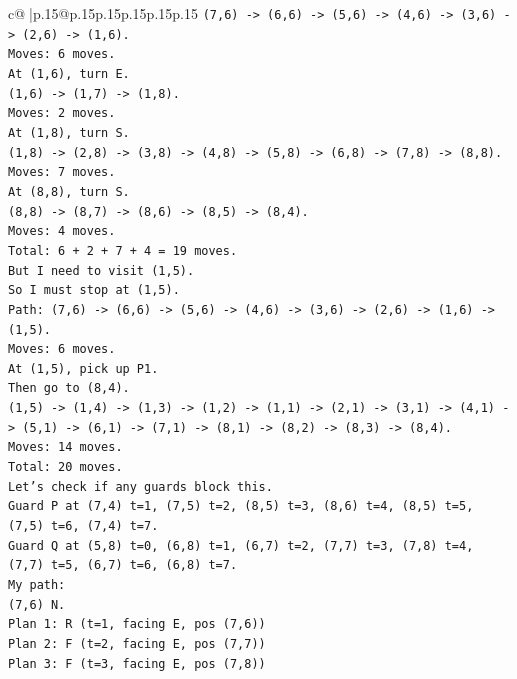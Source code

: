 \documentclass{article}
\begin{document}
{\begin{supertabular}{c@{$\;$}|p{.15\linewidth}@{}p{.15\linewidth}p{.15\linewidth}p{.15\linewidth}p{.15\linewidth}p{.15\linewidth}}
{{{\texttt{(7,6) {-}> (6,6) {-}> (5,6) {-}> (4,6) {-}> (3,6) {-}> (2,6) {-}> (1,6).} \\
\texttt{Moves: 6 moves.} \\
\texttt{At (1,6), turn E.} \\
\texttt{(1,6) {-}> (1,7) {-}> (1,8).} \\
\texttt{Moves: 2 moves.} \\
\texttt{At (1,8), turn S.} \\
\texttt{(1,8) {-}> (2,8) {-}> (3,8) {-}> (4,8) {-}> (5,8) {-}> (6,8) {-}> (7,8) {-}> (8,8).} \\
\texttt{Moves: 7 moves.} \\
\texttt{At (8,8), turn S.} \\
\texttt{(8,8) {-}> (8,7) {-}> (8,6) {-}> (8,5) {-}> (8,4).} \\
\texttt{Moves: 4 moves.} \\
\texttt{Total: 6 + 2 + 7 + 4 = 19 moves.} \\
\texttt{But I need to visit (1,5).} \\
\texttt{So I must stop at (1,5).} \\
\texttt{Path: (7,6) {-}> (6,6) {-}> (5,6) {-}> (4,6) {-}> (3,6) {-}> (2,6) {-}> (1,6) {-}> (1,5).} \\
\texttt{Moves: 6 moves.} \\
\texttt{At (1,5), pick up P1.} \\
\texttt{Then go to (8,4).} \\
\texttt{(1,5) {-}> (1,4) {-}> (1,3) {-}> (1,2) {-}> (1,1) {-}> (2,1) {-}> (3,1) {-}> (4,1) {-}> (5,1) {-}> (6,1) {-}> (7,1) {-}> (8,1) {-}> (8,2) {-}> (8,3) {-}> (8,4).} \\
\texttt{Moves: 14 moves.} \\
\texttt{Total: 20 moves.} \\
\texttt{Let's check if any guards block this.} \\
\texttt{Guard P at (7,4) t=1, (7,5) t=2, (8,5) t=3, (8,6) t=4, (8,5) t=5, (7,5) t=6, (7,4) t=7.} \\
\texttt{Guard Q at (5,8) t=0, (6,8) t=1, (6,7) t=2, (7,7) t=3, (7,8) t=4, (7,7) t=5, (6,7) t=6, (6,8) t=7.} \\
\texttt{My path:} \\
\texttt{(7,6) N.} \\
\texttt{Plan 1: R (t=1, facing E, pos (7,6))} \\
\texttt{Plan 2: F (t=2, facing E, pos (7,7))} \\
\texttt{Plan 3: F (t=3, facing E, pos (7,8))} \\
}}}
\end{supertabular}}
\end{document}
